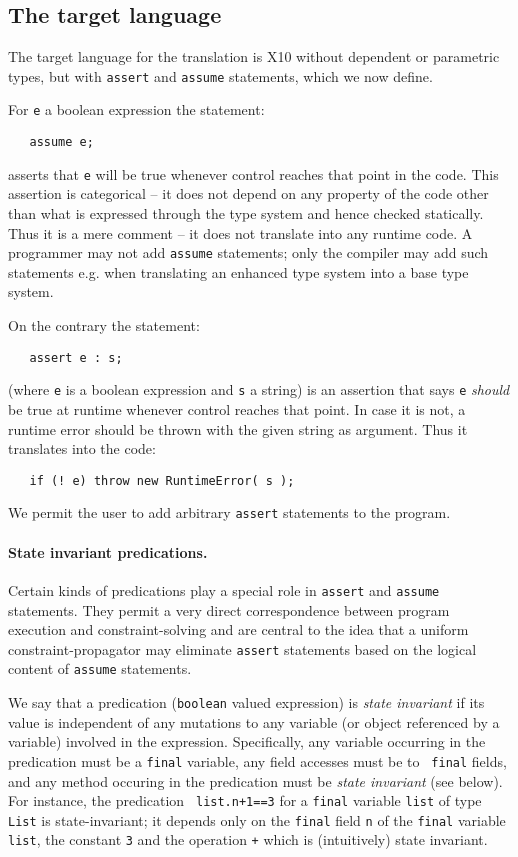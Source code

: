 \documentclass{article}
\def\Xten{{\sf X10}}
\begin{document}
\subsection{The target language}
The target language for the translation is \Xten{} without dependent
or parametric types, but with {\tt assert} and {\tt assume}
statements, which we now define.

For {\tt e} a boolean expression the statement:
{\footnotesize
\begin{verbatim}
   assume e; 
\end{verbatim}}
asserts that {\tt e} will be true whenever control reaches that point
in the code. This assertion is categorical -- it does not depend on
any property of the code other than what is expressed through the type
system and hence checked statically. Thus it is a mere comment -- it
does not translate into any runtime code.  A programmer may not add
{\tt assume} statements; only the compiler may add such statements
e.g.{} when translating an enhanced type system into a base type
system.

On the contrary the statement: 
{\footnotesize
\begin{verbatim}
   assert e : s; 
\end{verbatim}}
(where {\tt e} is a boolean expression and {\tt s} a string) is an
assertion that says {\tt e} {\em should} be true at runtime whenever
control reaches that point. In case it is not, a runtime error should be thrown
with the given string as argument. Thus it translates into the code:
{\footnotesize
\begin{verbatim}
   if (! e) throw new RuntimeError( s );
\end{verbatim}}

We permit the user to add arbitrary {\tt assert} statements to the
program.

\paragraph{State invariant predications.}
Certain kinds of predications play a special role in {\tt assert} and
{\tt assume} statements. They permit a very direct correspondence
between program execution and constraint-solving and are central to
the idea that a uniform constraint-propagator may eliminate {\tt assert}
statements based on the logical content of {\tt assume} statements. 

We say that a predication ({\tt boolean} valued expression) is {\em
state invariant} if its value is independent of any mutations to any
variable (or object referenced by a variable) involved in the
expression. Specifically, any variable occurring in the predication
must be a {\tt final} variable, any field accesses must be to {\tt
final} fields, and any method occuring in the predication must be {\em
state invariant} (see below).  For instance, the predication {\tt
list.n+1==3} for a {\tt final} variable {\tt list} of type {\tt List}
is state-invariant; it depends only on the {\tt final} field {\tt n}
of the {\tt final} variable {\tt list}, the constant {\tt 3} and the
operation {\tt +} which is (intuitively) state invariant.
\end{document}
